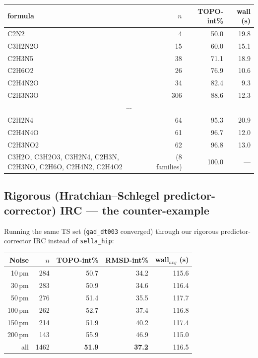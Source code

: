 \documentclass[11pt]{article}
\begin{document}
\begin{center}
\begin{tabular}{lrrr}
\toprule
formula & $n$ & TOPO-int\% & wall (s) \\
\midrule
C2N2      &   4 &  50.0 & 19.8 \\
C3H2N2O   &  15 &  60.0 & 15.1 \\
C2H3N5    &  38 &  71.1 & 18.9 \\
C2H6O2    &  26 &  76.9 & 10.6 \\
C2H4N2O   &  34 &  82.4 &  9.3 \\
C2H3N3O   & 306 &  88.6 & 12.3 \\
\multicolumn{4}{c}{$\cdots$} \\
C2H2N4    &  64 &  95.3 & 20.9 \\
C2H4N4O   &  61 &  96.7 & 12.0 \\
C2H3NO2   &  62 &  96.8 & 13.0 \\
C3H2O, C3H2O3, C3H2N4, C2H3N, C2H3NO, C2H6O, C2H4N2, C2H4O2 & (8 families) & 100.0 & --- \\
\bottomrule
\end{tabular}
\end{center}

\subsection{Rigorous (Hratchian--Schlegel predictor-corrector) IRC ---
the counter-example}

Running the same TS set (\texttt{gad\_dt003} converged) through our
rigorous predictor-corrector IRC instead of \texttt{sella\_hip}:

\begin{center}
\begin{tabular}{rrrrr}
\toprule
Noise & $n$ & TOPO-int\% & RMSD-int\% & wall$_{avg}$ (s) \\
\midrule
10\,pm  & 284 & 50.7 & 34.2 & 115.6 \\
30\,pm  & 283 & 50.9 & 34.6 & 116.4 \\
50\,pm  & 276 & 51.4 & 35.5 & 117.7 \\
100\,pm & 262 & 52.7 & 37.4 & 116.8 \\
150\,pm & 214 & 51.9 & 40.2 & 117.4 \\
200\,pm & 143 & 55.9 & 46.9 & 115.0 \\
\midrule
all     & 1462 & \textbf{51.9} & \textbf{37.2} & 116.5 \\
\bottomrule
\end{tabular}
\end{center}
\end{document}
